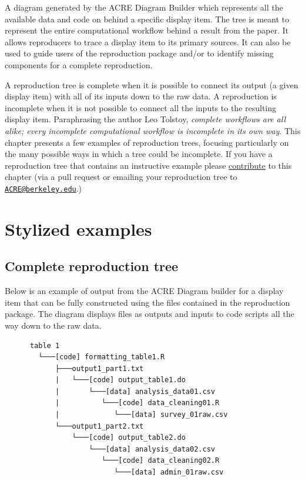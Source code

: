 \documentclass[]{book}
\begin{document}
A diagram generated by the ACRE Diagram Builder which represents all the available data and code on behind a specific display item. The tree is meant to represent the entire computational workflow behind a result from the paper. It allows reproducers to trace a display item to its primary sources. It can also be used to guide users of the reproduction package and/or to identify missing components for a complete reproduction.

A reproduction tree is complete when it is possible to connect its output (a given display item) with all of its inputs down to the raw data. A reproduction is incomplete when it is not possible to connect all the inputs to the resulting display item. Paraphrasing the author Leo Tolstoy, \emph{complete workflows are all alike; every incomplete computational workflow is incomplete in its own way}. This chapter presents a few examples of reproduction trees, focusing particularly on the many possible ways in which a tree could be incomplete. If you have a reproduction tree that contains an instructive example please \protect\hyperlink{contrib-guide}{contribute} to this chapter (via a pull request or emailing your reproduction tree to \href{mailto:ACRE@berkeley.edu}{\nolinkurl{ACRE@berkeley.edu}}.)

\hypertarget{stylized-examples}{%
\section{Stylized examples}\label{stylized-examples}}

\hypertarget{complete-reproduction-tree}{%
\subsection{Complete reproduction tree}\label{complete-reproduction-tree}}

Below is an example of output from the ACRE Diagram builder for a display item that can be fully constructed using the files contained in the reproduction package. The diagram displays files as outputs and inputs to code scripts all the way down to the raw data.

\begin{verbatim}
      table 1
        └───[code] formatting_table1.R
            ├───output1_part1.txt  
            |   └───[code] output_table1.do           
            |       └───[data] analysis_data01.csv
            |          └───[code] data_cleaning01.R
            |             └───[data] survey_01raw.csv
            └───output1_part2.txt  
                └───[code] output_table2.do           
                    └───[data] analysis_data02.csv
                       └───[code] data_cleaning02.R
                          └───[data] admin_01raw.csv  
\end{verbatim}
\end{document}

